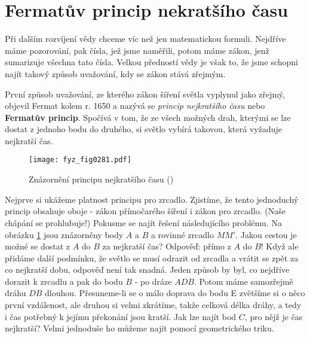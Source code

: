   \section{Fermatův princip nekratšího času}\label{fyz:IchapXXVIsecIII}
    Při dalším rozvíjení vědy chceme víc než jen matematickou formuli. Nejdříve máme pozorování, 
    pak čísla, jež jsme naměřili, potom máme zákon, jenž sumarizuje všechna tato čísla. Velkou 
    předností vědy je však to, že jsme schopni najít takový způsob uvažování, kdy se zákon stává 
    zřejmým. 
    
    První způsob uvažování, ze kterého zákon šíření světla vyplynul jako zřejmý, objevil Fermat 
    kolem r. 1650 a nazývá se \emph{princip nejkratšího času} nebo \textbf{Fermatův princip}. 
    Spočívá v tom, že ze všech možných drah, kterými se lze dostat z jednoho bodu do druhého, si 
    světlo vybírá takovou, která vyžaduje nejkratší čas. 

    \begin{figure}[ht!] %
      \centering
      \texttt{[image: fyz\_fig0281.pdf]}
      \caption{Znázornění principu nejkratšího času
               (\cite[s.~348]{Feynman01})}
      \label{fyz:fig0281}
    \end{figure}
    
    Nejprve si ukážeme platnost principu pro zrcadlo. Zjistíme, že tento jednoduchý princip 
    obsahuje oboje - zákon přímočarého šíření i zákon pro zrcadlo. (Naše chápání se prohlubuje!) 
    Pokusme se najít řešení následujícího problému. Na obrázku \ref{fyz:fig0281} jsou znázorněny 
    body \(A\) a \(B\) a rovinné zrcadlo \(MM'\). Jakou cestou je možné se dostat z \(A\) do \(B\) 
    za nejkratší čas? Odpověď: přímo z \(A\) do \(B\)! Když ale přidáme další podmínku, že světlo 
    se musí odrazit od zrcadla a vrátit se zpět za co nejkratší dobu, odpověď není tak snadná. 
    Jeden způsob by byl, co nejdříve dorazit k zrcadlu a pak do bodu \(B\) - po dráze \(ADB\). 
    Potom máme samozřejmě dráhu \(DB\) dlouhou. Přesuneme-li se o málo doprava do bodu E zvětšíme 
    si o něco první vzdálenost, ale druhou si velmi zkrátíme, takže celková délka dráhy, a tedy i 
    čas potřebný k jejímu překonání jsou kratší. Jak lze najít bod \(C\), pro nějž je čas 
    nejkratší? Velmi jednoduše ho můžeme najít pomocí geometrického triku.
    
